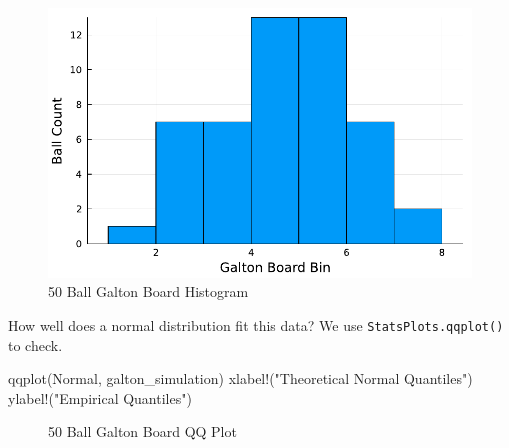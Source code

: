 \documentclass[
  letterpaper,
  DIV=11,
  numbers=noendperiod]{scrartcl}
\newenvironment{Shaded}{\begin{snugshade}}{\end{snugshade}}
\newcommand{\FunctionTok}[1]{\textcolor[rgb]{0.28,0.35,0.67}{#1}}
\newcommand{\NormalTok}[1]{\textcolor[rgb]{0.00,0.23,0.31}{#1}}
\newcommand{\StringTok}[1]{\textcolor[rgb]{0.13,0.47,0.30}{#1}}
\begin{document}
\begin{figure}[H]

{\centering \includegraphics{hw01_files/mediabag/hw01_files/figure-pdf/cell-15-output-1.pdf}

}

\caption{50 Ball Galton Board Histogram}

\end{figure}%

How well does a normal distribution fit this data? We use
\texttt{StatsPlots.qqplot()} to check.

\begin{Shaded}
\begin{Highlighting}[]
\FunctionTok{qqplot}\NormalTok{(Normal, galton\_simulation)}
\FunctionTok{xlabel!}\NormalTok{(}\StringTok{"Theoretical Normal Quantiles"}\NormalTok{)}
\FunctionTok{ylabel!}\NormalTok{(}\StringTok{"Empirical Quantiles"}\NormalTok{)}
\end{Highlighting}
\end{Shaded}

\begin{figure}[H]


\caption{\label{fig-galton-qq-1}50 Ball Galton Board QQ Plot}

\end{figure}%
\end{document}
